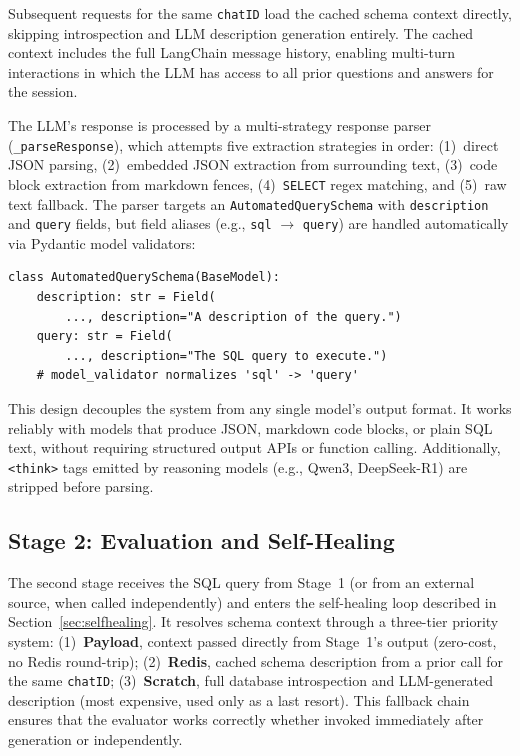 \documentclass{article}
\begin{document}
Subsequent requests for the same \texttt{chatID} load the cached schema context directly, skipping introspection and LLM description generation entirely. The cached context includes the full LangChain message history, enabling multi-turn interactions in which the LLM has access to all prior questions and answers for the session.

The LLM's response is processed by a multi-strategy response parser (\texttt{\_parseResponse}), which attempts five extraction strategies in order: (1)~direct JSON parsing, (2)~embedded JSON extraction from surrounding text, (3)~code block extraction from markdown fences, (4)~\texttt{SELECT} regex matching, and (5)~raw text fallback. The parser targets an \texttt{AutomatedQuerySchema} with \texttt{description} and \texttt{query} fields, but field aliases (e.g., \texttt{sql} $\to$ \texttt{query}) are handled automatically via Pydantic model validators:

\begin{lstlisting}[style=pythonstyle, caption={Response schema for SQL generation with alias normalization.}]
class AutomatedQuerySchema(BaseModel):
    description: str = Field(
        ..., description="A description of the query.")
    query: str = Field(
        ..., description="The SQL query to execute.")
    # model_validator normalizes 'sql' -> 'query'
\end{lstlisting}

This design decouples the system from any single model's output format. It works reliably with models that produce JSON, markdown code blocks, or plain SQL text, without requiring structured output APIs or function calling. Additionally, \texttt{<think>} tags emitted by reasoning models (e.g., Qwen3, DeepSeek-R1) are stripped before parsing.

\subsection{Stage 2: Evaluation and Self-Healing}

The second stage receives the SQL query from Stage~1 (or from an external source, when called independently) and enters the self-healing loop described in Section~\ref{sec:selfhealing}. It resolves schema context through a three-tier priority system: (1)~\textbf{Payload}, context passed directly from Stage~1's output (zero-cost, no Redis round-trip); (2)~\textbf{Redis}, cached schema description from a prior call for the same \texttt{chatID}; (3)~\textbf{Scratch}, full database introspection and LLM-generated description (most expensive, used only as a last resort). This fallback chain ensures that the evaluator works correctly whether invoked immediately after generation or independently.
\end{document}
